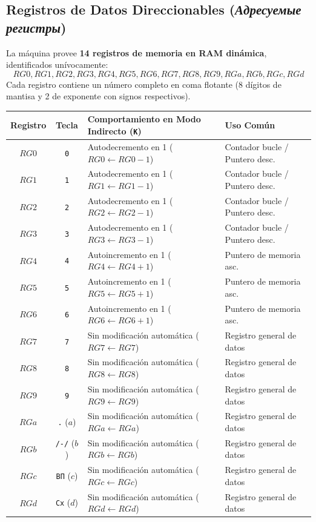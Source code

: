 \documentclass[11pt,a4paper]{article}
\begin{document}
\subsection{Registros de Datos Direccionables (\textit{Адресуемые регистры})}
La máquina provee \textbf{14 registros de memoria en RAM dinámica}, identificados unívocamente:
\[
RG0, RG1, RG2, RG3, RG4, RG5, RG6, RG7, RG8, RG9, RGa, RGb, RGc, RGd
\]
Cada registro contiene un número completo en coma flotante (8 dígitos de mantisa y 2 de exponente con signos respectivos).

\begin{center}
\small
\begin{tabular}{ccp{7.2cm}p{4.6cm}}
\toprule
\textbf{Registro} & \textbf{Tecla} & \textbf{Comportamiento en Modo Indirecto (\texttt{K})} & \textbf{Uso Común} \\
\midrule
$RG0$ & \texttt{0}       & Autodecremento en 1 ($RG0 \leftarrow RG0 - 1$) & Contador bucle / Puntero desc. \\
$RG1$ & \texttt{1}       & Autodecremento en 1 ($RG1 \leftarrow RG1 - 1$) & Contador bucle / Puntero desc. \\
$RG2$ & \texttt{2}       & Autodecremento en 1 ($RG2 \leftarrow RG2 - 1$) & Contador bucle / Puntero desc. \\
$RG3$ & \texttt{3}       & Autodecremento en 1 ($RG3 \leftarrow RG3 - 1$) & Contador bucle / Puntero desc. \\
\midrule
$RG4$ & \texttt{4}       & Autoincremento en 1 ($RG4 \leftarrow RG4 + 1$) & Puntero de memoria asc. \\
$RG5$ & \texttt{5}       & Autoincremento en 1 ($RG5 \leftarrow RG5 + 1$) & Puntero de memoria asc. \\
$RG6$ & \texttt{6}       & Autoincremento en 1 ($RG6 \leftarrow RG6 + 1$) & Puntero de memoria asc. \\
\midrule
$RG7$ & \texttt{7}       & Sin modificación automática ($RG7 \leftarrow RG7$) & Registro general de datos \\
$RG8$ & \texttt{8}       & Sin modificación automática ($RG8 \leftarrow RG8$) & Registro general de datos \\
$RG9$ & \texttt{9}       & Sin modificación automática ($RG9 \leftarrow RG9$) & Registro general de datos \\
$RGa$ & \texttt{.} ($a$) & Sin modificación automática ($RGa \leftarrow RGa$) & Registro general de datos \\
$RGb$ & \texttt{/-/} ($b$)& Sin modificación automática ($RGb \leftarrow RGb$) & Registro general de datos \\
$RGc$ & \texttt{ВП} ($c$)& Sin modificación automática ($RGc \leftarrow RGc$) & Registro general de datos \\
$RGd$ & \texttt{Сх} ($d$)& Sin modificación automática ($RGd \leftarrow RGd$) & Registro general de datos \\
\bottomrule
\end{tabular}
\end{center}
\end{document}
